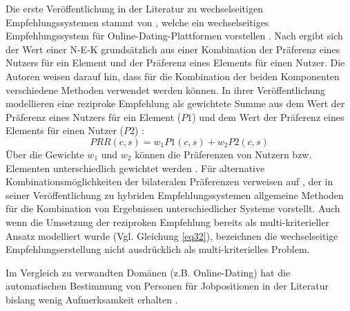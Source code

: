 Die erste Veröffentlichung in der Literatur zu wechselseitigen Empfehlungssystemen stammt von \textcite[S. 1ff.]{pizzato:inproceedings}, welche ein wechselseitiges Empfehlungssystem für Online-Dating-Plattformen vorstellen \cite[S. 1469]{yildirim:article}.
Nach \textcite[S. 5]{pizzato:inproceedings} ergibt sich der Wert einer \ac{N-E-K} grundsätzlich aus einer Kombination der Präferenz eines Nutzers für ein Element und der Präferenz eines Elements für einen Nutzer.
Die Autoren weisen darauf hin, dass für die Kombination der beiden Komponenten verschiedene Methoden verwendet werden können.
In ihrer Veröffentlichung modellieren \textcite[S. 6]{pizzato:inproceedings} eine reziproke Empfehlung als gewichtete Summe aus dem Wert der Präferenz eines Nutzers für ein Element ($P1$) und dem Wert der Präferenz eines Elements für einen Nutzer ($P2$) \cite[S. 6]{pizzato:inproceedings}:
\begin{equation}\label{eq32}
    PRR(c,s) = w_{1}P1(c,s) + w_{2}P2(c,s)
\end{equation}
Über die Gewichte $w_{1}$ und $w_{2}$ können die Präferenzen von Nutzern bzw. Elementen unterschiedlich gewichtet werden \cite[S. 6]{pizzato:inproceedings}.
Für alternative Kombinationsmöglichkeiten der bilateralen Präferenzen verweisen \textcite[S. 5]{pizzato:inproceedings} auf \textcite[S. 339ff.]{burke:article}, der in seiner Veröffentlichung zu hybriden Empfehlungssystemen allgemeine Methoden für die Kombination von Ergebnissen unterschiedlicher Systeme vorstellt.
Auch wenn die Umsetzung der reziproken Empfehlung bereits als multi-kriterieller Ansatz modelliert wurde (Vgl. Gleichung \ref{eq32}), bezeichnen \textcite[S. 1ff.]{pizzato:inproceedings} die wechselseitige Empfehlungserstellung nicht ausdrücklich als multi-kriterielles Problem. 


Im Vergleich zu verwandten Domänen (z.B. Online-Dating) hat die automatischen Bestimmung von Personen für Jobpositionen in der Literatur bislang wenig Aufmerksamkeit erhalten \cite[S. 1469]{yildirim:article}.

